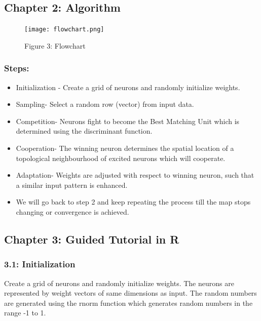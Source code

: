 \documentclass[
]{article}
\providecommand{\tightlist}{%
  \setlength{\itemsep}{0pt}\setlength{\parskip}{0pt}}
\begin{document}
\hypertarget{chapter-2-algorithm}{%
\subsection{Chapter 2: Algorithm}\label{chapter-2-algorithm}}

\begin{figure}
\centering
\texttt{[image: flowchart.png]}
\caption{Figure 3: Flowchart}
\end{figure}

\hypertarget{steps}{%
\subsubsection{Steps:}\label{steps}}

\begin{itemize}
\tightlist
\item
  Initialization - Create a grid of neurons and randomly initialize
  weights.
\item
  Sampling- Select a random row (vector) from input data.
\item
  Competition- Neurons fight to become the Best Matching Unit which is
  determined using the discriminant function.
\item
  Cooperation- The winning neuron determines the spatial location of a
  topological neighbourhood of excited neurons which will cooperate.
\item
  Adaptation- Weights are adjusted with respect to winning neuron, such
  that a similar input pattern is enhanced.
\item
  We will go back to step 2 and keep repeating the process till the map
  stops changing or convergence is achieved.
\end{itemize}

\hypertarget{chapter-3-guided-tutorial-in-r}{%
\subsection{Chapter 3: Guided Tutorial in
R}\label{chapter-3-guided-tutorial-in-r}}

\hypertarget{initialization}{%
\subsubsection{3.1: Initialization}\label{initialization}}

Create a grid of neurons and randomly initialize weights. The neurons
are represented by weight vectors of same dimensions as input. The
random numbers are generated using the rnorm function which generates
random numbers in the range -1 to 1.
\end{document}
